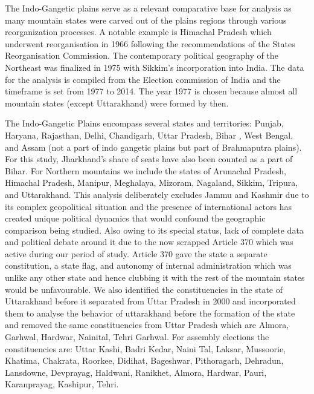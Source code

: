 The Indo-Gangetic plains serve as a relevant comparative base for analysis as many mountain states were carved out of the plains regions through various reorganization processes. A notable example is Himachal Pradesh which underwent reorganisation in 1966 following the recommendations of the States Reorganisation Commission. The contemporary political geography of the Northeast was finalized in 1975 with Sikkim's incorporation into India. The data for the analysis is compiled from the Election commission of India and the timeframe is set from 1977 to 2014. The year 1977 is chosen because almost all mountain states (except Uttarakhand) were formed by then. 

\vspace{0.3cm} 

The Indo-Gangetic Plains encompass several states and territories: Punjab, Haryana, Rajasthan, Delhi, Chandigarh, Uttar Pradesh, Bihar , West Bengal, and Assam (not a part of indo gangetic plains but part of Brahmaputra plains). For this study,  Jharkhand's share of seats have also been counted as a part of Bihar. For Northern mountains we include the states of Arunachal Pradesh, Himachal Pradesh, Manipur, Meghalaya, Mizoram, Nagaland, Sikkim, Tripura, and Uttarakhand. This analysis deliberately excludes Jammu and Kashmir due to its complex geopolitical situation and the presence of international actors has created unique political dynamics that would confound the geographic comparison being studied. Also owing to its special status, lack of complete data and political debate around it due to the now scrapped Article 370 which was active during our period of study. Article 370 gave the state a separate constitution, a state flag, and autonomy of internal administration which was unlike any other state and hence clubbing it with the rest of the mountain states would be unfavourable. We also identified the constituencies in the state of Uttarakhand before it separated from Uttar Pradesh in 2000 and incorporated them to analyse the behavior of uttarakhand before the formation of the state and removed the same constituencies from Uttar Pradesh which are Almora, Garhwal, Hardwar, Nainital, Tehri Garhwal. For assembly elections the constituencies are: Uttar Kashi, Badri Kedar, Naini Tal, Laksar, Mussoorie, Khatima, Chakrata, Roorkee, Didihat, Bageshwar, Pithoragarh, Dehradun, Lansdowne, Devprayag, Haldwani, Ranikhet, Almora, Hardwar, Pauri, Karanprayag, Kashipur, Tehri.

\vspace{0.3cm}


